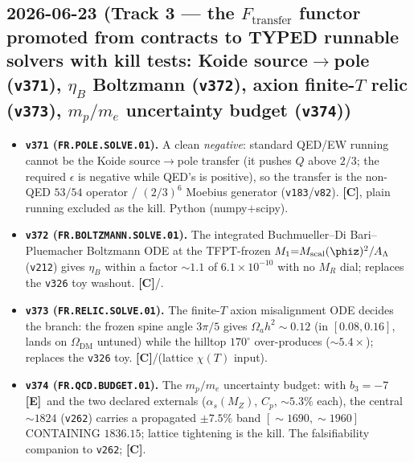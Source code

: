 \documentclass[11pt]{article}
\providecommand{\mE}{\textbf{[E]}}\providecommand{\mC}{\textbf{[C]}}
\providecommand{\vref}[1]{\texttt{#1}}
\begin{document}
\subsection*{2026-06-23 (Track 3 --- the $F_{\mathrm{transfer}}$ functor promoted from contracts to TYPED runnable solvers with kill tests: Koide source$\to$pole (\texttt{v371}), $\eta_B$ Boltzmann (\texttt{v372}), axion finite-$T$ relic (\texttt{v373}), $m_p/m_e$ uncertainty budget (\texttt{v374}))}
\begin{itemize}
\item \textbf{\texttt{v371} (\texttt{FR.POLE.SOLVE.01}).} A clean \emph{negative}: standard QED/EW running cannot
be the Koide source$\to$pole transfer (it pushes $Q$ above $2/3$; the required $\epsilon$ is negative while
QED's is positive), so the transfer is the non-QED $53/54$ operator / $(2/3)^6$ Moebius generator
(\vref{v183}/\vref{v82}). \mC, plain running excluded as the kill. Python (numpy$+$scipy).
\item \textbf{\texttt{v372} (\texttt{FR.BOLTZMANN.SOLVE.01}).} The integrated Buchmueller--Di Bari--Pluemacher
Boltzmann ODE at the TFPT-frozen $M_1{=}M_{\mathrm{scal}}(\phiz)^2/A_\Lambda$ (\vref{v212}) gives $\eta_B$ within a
factor ${\sim}1.1$ of $6.1{\times}10^{-10}$ with no $M_R$ dial; replaces the \vref{v326} toy washout. \mC/\mX.
\item \textbf{\texttt{v373} (\texttt{FR.RELIC.SOLVE.01}).} The finite-$T$ axion misalignment ODE decides the
branch: the frozen spine angle $3\pi/5$ gives $\Omega_a h^2{\sim}0.12$ (in $[0.08,0.16]$, lands on
$\Omega_{\mathrm{DM}}$ untuned) while the hilltop $170^\circ$ over-produces (${\sim}5.4\times$); replaces the
\vref{v326} toy. \mC/\mX (lattice $\chi(T)$ input).
\item \textbf{\texttt{v374} (\texttt{FR.QCD.BUDGET.01}).} The $m_p/m_e$ uncertainty budget: with $b_3{=}-7$
\mE\ and the two declared externals ($\alpha_s(M_Z)$, $C_p$, ${\sim}5.3\%$ each), the central ${\sim}1824$
(\vref{v262}) carries a propagated ${\pm}7.5\%$ band $[\sim1690,\sim1960]$ CONTAINING $1836.15$; lattice
tightening is the kill. The falsifiability companion to \vref{v262}; \mC.
\end{itemize}
\end{document}

